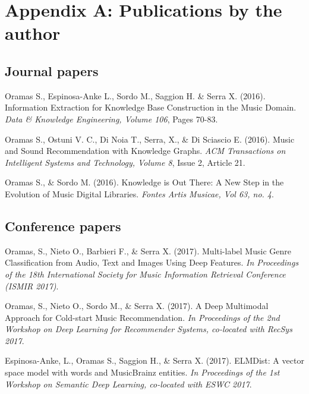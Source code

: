 
\chapter{Appendix A: Publications by the author}
\label{sec:Pubs}


\section*{Journal papers}


Oramas S., Espinosa-Anke L., Sordo M., Saggion H. \& Serra X. (2016). Information Extraction for Knowledge Base Construction in the Music Domain. \emph{Data \& Knowledge Engineering, Volume 106}, Pages 70-83.

\vspace{0.2cm}

Oramas S., Ostuni V. C., Di Noia T., Serra, X., \& Di Sciascio E. (2016). Music and Sound Recommendation with Knowledge Graphs. \emph{ACM Transactions on Intelligent Systems and Technology, Volume 8}, Issue 2, Article 21.

\vspace{0.2cm}

Oramas S., \& Sordo M. (2016). Knowledge is Out There: A New Step in the Evolution of Music Digital Libraries. \emph{Fontes Artis Musicae, Vol 63, no. 4}.


\section*{Conference papers}

Oramas, S., Nieto O., Barbieri F., \& Serra X. (2017).  Multi-label Music Genre Classification from Audio, Text and Images Using Deep Features. \emph{In Proceedings of the 18th International Society for Music Information Retrieval Conference (ISMIR 2017)}.

\vspace{0.2cm}

Oramas, S., Nieto O., Sordo M., \& Serra X. (2017).  A Deep Multimodal Approach for Cold-start Music Recommendation. \emph{In Proceedings of the 2nd Workshop on Deep Learning for Recommender Systems, co-located with RecSys 2017}.

\vspace{0.2cm}

Espinosa-Anke, L., Oramas S., Saggion H., \& Serra X. (2017).  ELMDist: A vector space model with words and MusicBrainz entities. \emph{In Proceedings of the 1st Workshop on Semantic Deep Learning, co-located with ESWC 2017}. 

